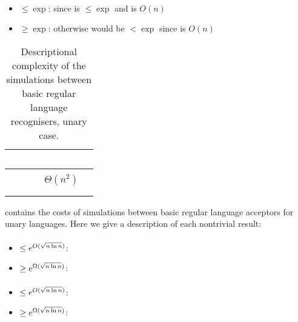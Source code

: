\paragraph{\ODLA{}\tto\TDFA}
\begin{itemize}
	\item $\le\exp$: since \hyperref[cost:1DLAto1DFA]{\ODLA{}\tto\ODFA} is $\le\exp$ and \ODFA\tto\TDFA is $O(n)$
	\item $\ge\exp$: otherwise \hyperref[cost:1DLAto2NFA]{\ODLA{}\tto\TNFA} would be $<\exp$ since \TDFA\tto\TNFA is $O(n)$
\end{itemize}


\begin{table}
	\centering
	\renewcommand{\arraystretch}{1.2}
	\begin{tabular}{|l|l|l|p{4.3em}|l|}
		\hline
		~     & \ODFA           & \ONFA           & \TDFA                                            & \TNFA  \\ \hline
		\ODFA & \cY             & \Ctriv          & \Ctriv                                           & \Ctriv \\ \hline
		\ONFA & \rbt{$\CsubEq$} & \cY             & \cR $\Theta(n^2)$                                & \Ctriv \\ \hline
		\TDFA & \rbt{$\CsubEq$} & \rbt{$\CsubEq$} & \cY                                              & \Ctriv \\ \hline
		\TNFA & \rbt{$\CsubEq$} & \rbt{$\CsubEq$} & \cR \rbt[.4]{$\le\Csubln$} \rbt[.3]{$\ge\Cpoly$} & \cY    \\ \hline
	\end{tabular}
	\caption{Descriptional complexity of the simulations between basic regular language recognisers, unary case.}
	\label{tab:sims-core-unary}
\end{table}

 contains the costs of simulations between basic regular language acceptors for unary languages.
Here we give a description of each nontrivial result:

\paragraph{\ONFA{}\tto\ODFA}
\begin{itemize}
	\item $\le e^{O(\sqrt{n\ln n})}$: \cite{Chr86}
	\item $\ge e^{\Omega(\sqrt{n\ln n})}$: \cite{Chr86}
\end{itemize}
\paragraph{\TDFA{}\tto\ODFA}\label{cost:2DFAto1DFAu}
\begin{itemize}
	\item $\le e^{O(\sqrt{n\ln n})}$: \cite{Chr86}
	\item $\ge e^{\Omega(\sqrt{n\ln n})}$: \cite{Chr86}
\end{itemize}
